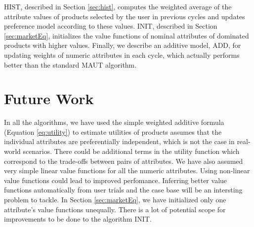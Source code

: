 HIST, described in Section \ref{sec:hist}, computes the weighted average of the attribute values of products selected by the user in previous cycles and updates preference model according to these values.
INIT, described in Section \ref{sec:marketEq}, initializes the value functions of  nominal attributes of dominated products with higher values.
Finally, we describe an additive model, ADD, for updating weights of numeric attributes in each cycle, which actually performs better than the standard MAUT algorithm.


\section{Future Work}
In all the algorithms, we have used the simple weighted additive formula  (Equation \ref{eq:utility}) to estimate utilities of products assumes that the individual attributes are preferentially independent, which is not the case in real-world scenarios.
There could be additional terms in the utility function which correspond to the trade-offs between pairs of attributes.
We have also assumed very simple linear value functions for all the numeric attributes. 
Using non-linear value functions could lead to improved perfomance.
Inferring better value functions automatically from user trials and the case base will be an intersting problem to tackle.
In Section \ref{sec:marketEq}, we have initialized only one attribute's value functions unequally. 
There is a lot of potential scope for improvements to be done to the algorithm INIT.
